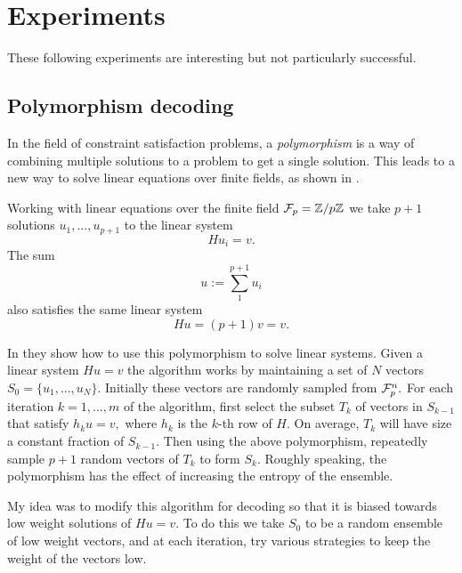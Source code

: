 \documentclass[12pt]{article}
\begin{document}
\section{Experiments}

These following experiments are interesting
but not particularly successful.

\subsection{Polymorphism decoding}

In the field of constraint satisfaction problems,
a \emph{polymorphism} is a way of combining multiple solutions
to a problem to get a single solution.
This leads to a new way to solve linear equations
over finite fields, as shown in \cite{brown2016}.

Working with linear equations over the finite
field $\mathcal{F}_p = \mathbb{Z}/p\mathbb{Z}$
we take $p+1$ solutions $u_1,...,u_{p+1}$ 
to the linear system
$$
    H u_i = v.
$$
The sum 
$$
    u := \sum_{1}^{p+1} u_i
$$
also satisfies the same linear system
$$
    H u = (p+1)v = v.
$$

In \cite{brown2016} they show how to use this
polymorphism to solve linear systems.
Given a linear system $H u = v$
the algorithm works by maintaining a set
of $N$ vectors $S_0 = \{u_1, ..., u_N \}.$
Initially these vectors are randomly sampled from
$\mathcal{F}_p^n.$
For each iteration $k=1,...,m$ of the algorithm, first
select the subset $T_k$ of vectors in $S_{k-1}$ that satisfy 
$h_k u = v,$ where $h_k$ is the $k$-th row of $H.$
On average, $T_k$ will have size a constant fraction of $S_{k-1}$.
Then using the above polymorphism, repeatedly
sample $p+1$ random vectors of $T_k$ to
form $S_k.$
Roughly speaking,
the polymorphism has the effect of increasing the entropy
of the ensemble.

My idea was to modify this algorithm for decoding 
so that it is biased towards low weight solutions of $Hu = v.$
To do this we take $S_0$ to be a random ensemble of low
weight vectors, and at each iteration, try various
strategies to keep the weight of the vectors low.

\end{document}
